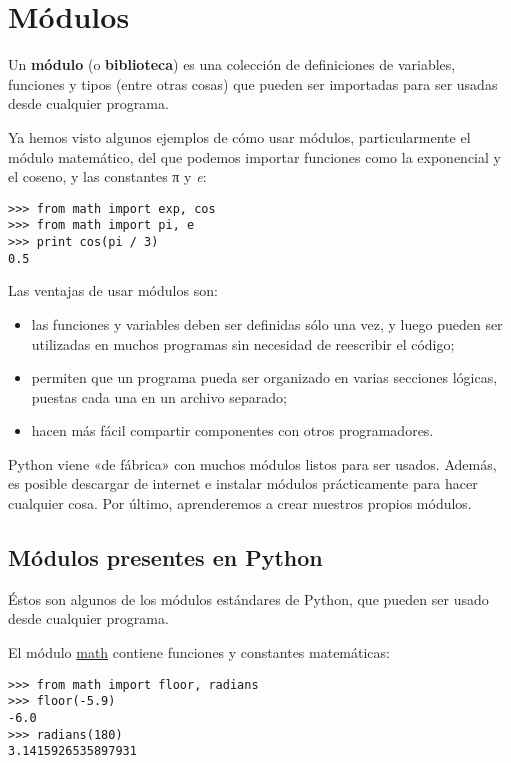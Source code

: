 \chapter{Módulos}

Un \textbf{módulo} (o \textbf{biblioteca}) es una colección de
definiciones de variables, funciones y tipos (entre otras cosas) que
pueden ser importadas para ser usadas desde cualquier programa.

Ya hemos visto algunos ejemplos de cómo usar módulos, particularmente el
módulo matemático, del que podemos importar funciones como la
exponencial y el coseno, y las constantes π y \emph{e}:

\begin{lstlisting}
>>> from math import exp, cos
>>> from math import pi, e
>>> print cos(pi / 3)
0.5
\end{lstlisting}

Las ventajas de usar módulos son:

\begin{itemize}
\item
  las funciones y variables deben ser definidas sólo una vez, y luego
  pueden ser utilizadas en muchos programas sin necesidad de reescribir
  el código;
\item
  permiten que un programa pueda ser organizado en varias secciones
  lógicas, puestas cada una en un archivo separado;
\item
  hacen más fácil compartir componentes con otros programadores.
\end{itemize}

Python viene «de fábrica» con muchos módulos listos para ser usados.
Además, es posible descargar de internet e instalar módulos
prácticamente para hacer cualquier cosa. Por último, aprenderemos a
crear nuestros propios módulos.

\section{Módulos presentes en Python}

Éstos son algunos de los módulos estándares de Python, que pueden ser
usado desde cualquier programa.

El módulo \href{http://docs.python.org/library/math.html}{math} contiene
funciones y constantes matemáticas:

\begin{lstlisting}
>>> from math import floor, radians
>>> floor(-5.9)
-6.0
>>> radians(180)
3.1415926535897931
\end{lstlisting}

